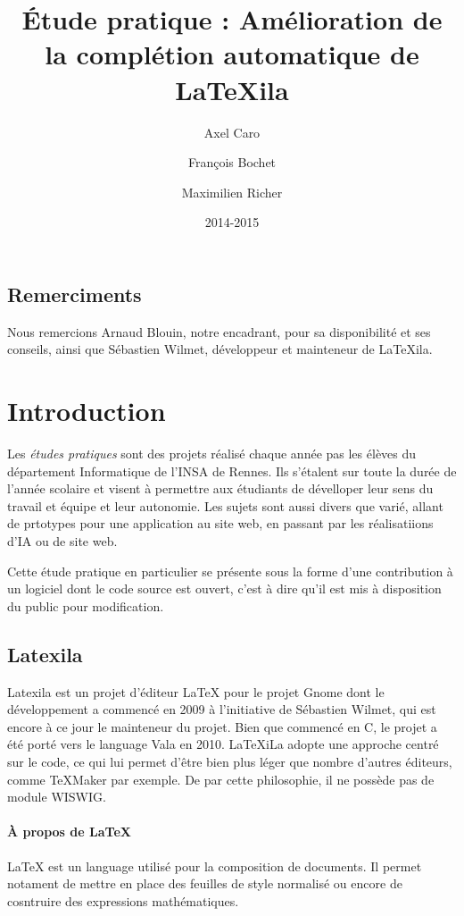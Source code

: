\documentclass[a4paper,11pt]{report}
\title{Étude pratique : Amélioration de la complétion automatique de \LaTeX{}ila}
\author{Axel Caro\and François Bochet\and Maximilien Richer}
\date{2014-2015}
\begin{document}
\maketitle %
\tableofcontents %

\section{Remerciments} %
\label{sec:remerciments}
Nous remercions Arnaud Blouin, notre encadrant, pour sa disponibilité et ses conseils, ainsi que Sébastien Wilmet, développeur et mainteneur de LaTeXila.

\chapter{Introduction}
\label{cha:Introduction}
Les \textit{études pratiques} sont des projets réalisé chaque année pas les élèves du département Informatique de l'INSA de Rennes. Ils s'étalent sur toute la durée de l'année scolaire et visent à permettre aux étudiants de dévelloper leur sens du travail et équipe et leur autonomie. Les sujets sont aussi divers que varié, allant de prtotypes pour une application au site web, en passant par les réalisatiions d'IA ou de site web.

Cette étude pratique en particulier se présente sous la forme d'une contribution à un logiciel dont le code source est ouvert, c'est à dire qu'il est mis à disposition du public pour modification.

\section{Latexila}
\label{sec:latexila}
Latexila est un projet d'éditeur LaTeX pour le projet Gnome dont le développement a commencé en 2009 à l'initiative de Sébastien Wilmet, qui est encore à ce jour le mainteneur du projet. Bien que commencé en C, le projet a été porté vers le language Vala en 2010. LaTeXiLa adopte une approche centré sur le code, ce qui lui permet d'être bien plus léger que nombre d'autres éditeurs, comme TeXMaker par exemple. De par cette philosophie, il ne possède pas de module WISWIG.

\subsubsection{À propos de \LaTeX{}}
LaTeX est un language utilisé pour la composition de documents. Il permet notament de mettre en place des feuilles de style normalisé ou encore de cosntruire des expressions mathématiques.
\end{document}
